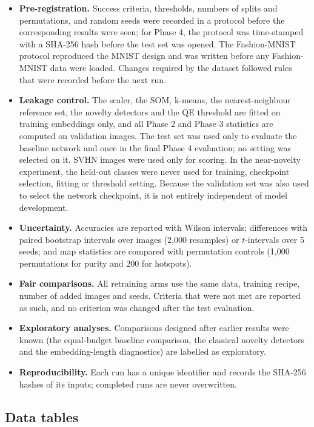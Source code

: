 \documentclass{scrartcl}
\begin{document}
\begin{itemize}
  \item \textbf{Pre-registration.} Success criteria, thresholds, numbers of splits and permutations, and random seeds were recorded in a protocol before the corresponding results were seen; for Phase 4, the protocol was time-stamped with a SHA-256 hash before the test set was opened. The Fashion-MNIST protocol reproduced the MNIST design and was written before any Fashion-MNIST data were loaded. Changes required by the dataset followed rules that were recorded before the next run.
  \item \textbf{Leakage control.} The scaler, the SOM, k-means, the nearest-neighbour reference set, the novelty detectors and the QE threshold are fitted on training embeddings only, and all Phase 2 and Phase 3 statistics are computed on validation images. The test set was used only to evaluate the baseline network and once in the final Phase 4 evaluation; no setting was selected on it. SVHN images were used only for scoring. In the near-novelty experiment, the held-out classes were never used for training, checkpoint selection, fitting or threshold setting. Because the validation set was also used to select the network checkpoint, it is not entirely independent of model development.
  \item \textbf{Uncertainty.} Accuracies are reported with Wilson intervals; differences with paired bootstrap intervals over images (2,000 resamples) or $t$-intervals over 5 seeds; and map statistics are compared with permutation controls (1,000 permutations for purity and 200 for hotspots).
  \item \textbf{Fair comparisons.} All retraining arms use the same data, training recipe, number of added images and seeds. Criteria that were not met are reported as such, and no criterion was changed after the test evaluation.
  \item \textbf{Exploratory analyses.} Comparisons designed after earlier results were known (the equal-budget baseline comparison, the classical novelty detectors and the embedding-length diagnostics) are labelled as exploratory.
  \item \textbf{Reproducibility.} Each run has a unique identifier and records the SHA-256 hashes of its inputs; completed runs are never overwritten.
\end{itemize}

\subsection{Data tables}
\end{document}
